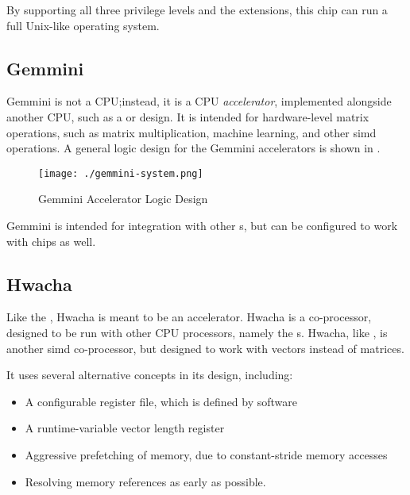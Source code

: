 By supporting all three privilege levels and the extensions, this chip can run a full Unix-like operating system.

\subsection{Gemmini}\label{sec:Gemmini_Generator}
\nocite{gemminiGithub}
\nocite{gemminiPaper}
Gemmini is not a CPU;\@ instead, it is a CPU \emph{\gls{accelerator}}, implemented alongside another CPU, such as a  or  design.
It is intended for hardware-level matrix operations, such as matrix multiplication, machine learning, and other \gls{simd} operations.
A general logic design for the Gemmini \glspl{accelerator} is shown in .

\begin{figure}[h!tbp]
  \centering
  \texttt{[image: ./gemmini-system.png]}
  \caption{Gemmini Accelerator Logic Design \parencite{gemminiGithub}}
  \label{fig:Gemmini_Accelerator}
\end{figure}

Gemmini is intended for integration with other s, but can be configured to work with  chips as well.

\subsection{Hwacha}\label{sec:Hwacha}
\nocite{hwachaGithub}
\nocite{hwachaPresentation}
Like the , Hwacha is meant to be an \gls{accelerator}.
Hwacha is a co-processor, designed to be run with other CPU processors, namely the s.
Hwacha, like , is another \gls{simd} co-processor, but designed to work with vectors instead of matrices.

It uses several alternative concepts in its design, including:
\begin{itemize}
\item A configurable register file, which is defined by software
\item A runtime-variable vector length register
\item Aggressive prefetching of memory, due to constant-stride memory accesses
\item Resolving memory references as early as possible.
\end{itemize}

